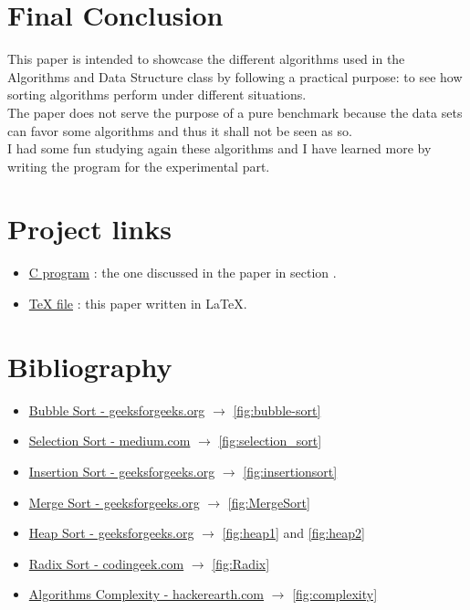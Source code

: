 \documentclass{article}
\begin{document}
\section{Final Conclusion}

This paper is intended to showcase the different algorithms used in the Algorithms and Data Structure class by following a practical purpose: to see how sorting algorithms perform under different situations.\\
The paper does not serve the purpose of a pure benchmark because the data sets
can favor some algorithms and thus it shall not be seen as so.\\
I had some fun studying again these algorithms and I have learned more by writing the program for the experimental part.

\clearpage

\section{Project links}

\begin{itemize}
    \item \href{https://github.com/pythographer/MPI-project/blob/main/project_improved.c}{C program} : the one discussed in the paper in section .
    \item \href{https://github.com/pythographer/MPI-project/blob/main/main.tex}{TeX file} : this paper written in \LaTeX.
\end{itemize}

\clearpage
\section{Bibliography}

\noindent\begin{itemize}
    \item \href{https://www.geeksforgeeks.org/bubble-sort/}{Bubble Sort - geeksforgeeks.org} $\rightarrow$ \autoref{fig:bubble-sort}
    \item \href{https://medium.com/@paulsoham/selection-sort-df6c93d9da3d}{Selection Sort - medium.com} $\rightarrow$ \autoref{fig:selection_sort}
    \item \href{https://www.geeksforgeeks.org/insertion-sort/}{Insertion Sort - geeksforgeeks.org} $\rightarrow$ \autoref{fig:insertionsort}
    \item \href{https://www.geeksforgeeks.org/merge-sort/}{Merge Sort - geeksforgeeks.org}   $\rightarrow$ \autoref{fig:MergeSort}
    \item \href{https://www.geeksforgeeks.org/heap-sort/}{Heap Sort - geeksforgeeks.org}     $\rightarrow$ \autoref{fig:heap1} and \autoref{fig:heap2}
    \item \href{https://www.codingeek.com/algorithms/radix-sort-explanation-pseudocode-and-implementation/}{Radix Sort - codingeek.com} $\rightarrow$ \autoref{fig:Radix}
    \item \href{https://www.hackerearth.com/practice/notes/sorting-and-searching-algorithms-time-complexities-cheat-sheet/}{Algorithms Complexity - hackerearth.com} $\rightarrow$ \autoref{fig:complexity}
\end{itemize}
\end{document}
